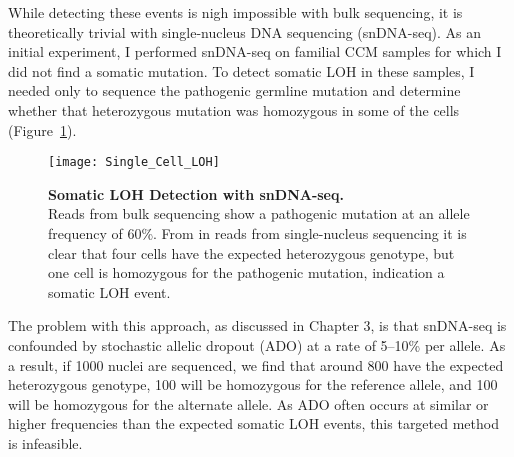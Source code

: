 While detecting these events is nigh impossible with bulk sequencing, it is theoretically trivial with single-nucleus DNA sequencing (snDNA-seq). As an initial experiment, I performed snDNA-seq on familial CCM samples for which I did not find a somatic mutation. To detect somatic LOH in these samples, I needed only to sequence the pathogenic germline mutation and determine whether that heterozygous mutation was homozygous in some of the cells (Figure~\ref{Single_Cell_LOH}).
\begin{figure}[tbp!]
\begin{center}
\texttt{[image: Single\_Cell\_LOH]}
\end{center}
\caption[Somatic LOH Detection with snDNA-seq]{\textbf{Somatic LOH Detection with snDNA-seq.} \\  Reads from bulk sequencing show a pathogenic mutation at an allele frequency of 60\%. From in reads from single-nucleus sequencing it is clear that four cells have the expected heterozygous genotype, but one cell is homozygous for the pathogenic mutation, indication a somatic LOH event. }
\label{Single_Cell_LOH}
\end{figure}
The problem with this approach, as discussed in Chapter 3, is that snDNA-seq is confounded by stochastic allelic dropout (ADO) at a rate of 5--10\% per allele. As a result, if 1000 nuclei are sequenced, we find that around 800 have the expected heterozygous genotype, 100 will be homozygous for the reference allele, and 100 will be homozygous for the alternate allele. As ADO often occurs at similar or higher frequencies than the expected somatic LOH events, this targeted method is infeasible. 

